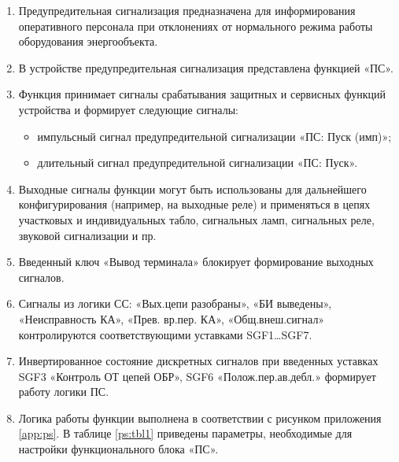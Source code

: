 
\color{black}

\begin{enumerate}

\item	
Предупредительная сигнализация предназначена для информирования оперативного персонала при отклонениях от нормального режима работы оборудования энергообъекта.

\item
В устройстве предупредительная сигнализация представлена функцией «ПС».

\item
Функция принимает сигналы срабатывания защитных и сервисных функций устройства и формирует следующие сигналы:
\begin{itemize}
	\item импульсный сигнал предупредительной сигнализации «ПС: Пуск (имп)»;
	\item длительный сигнал предупредительной сигнализации «ПС: Пуск».
\end{itemize}

\item
Выходные сигналы функции могут быть использованы для дальнейшего конфигурирования (например, на выходные реле) и применяться в цепях участковых и индивидуальных табло, сигнальных ламп, сигнальных реле, звуковой сигнализации и пр.

\item
Введенный ключ «Вывод терминала» блокирует формирование выходных сигналов.

\item
Сигналы из логики СС: «Вых.цепи разобраны», «БИ выведены», «Неисправность КА», «Прев. вр.пер. КА», «Общ.внеш.сигнал» контролируются соответствующими уставками SGF1\ldots SGF7.

\item
Инвертированное состояние дискретных сигналов при введенных уставках SGF3 «Контроль ОТ цепей ОБР», SGF6 «Полож.пер.ав.дебл.» формирует работу логики ПС.

\item
Логика работы функции выполнена в соответствии с рисунком приложения \ref{app:ps}. В таблице \ref{ps:tbl1} приведены параметры, необходимые для настройки функционального блока «ПС». 

\end{enumerate}